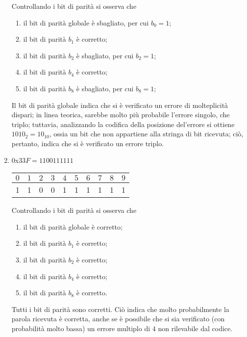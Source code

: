 \documentclass[a4paper]{extarticle}
\renewcommand\arraystretch{}
\begin{document}
\begin{enumerate}
    \vspace{1em}
    \noindent
    Controllando i bit di parità si osserva che
    \begin{enumerate}
        \item il bit di parità globale è sbagliato, per cui $b_0=1$;
        \item il bit di parità $b_1$ è corretto;
        \item il bit di parità $b_2$ è sbagliato, per cui $b_2=1$;
        \item il bit di parità $b_4$ è corretto;
        \item il bit di parità $b_8$ è sbagliato, per cui $b_8=1$; 
    \end{enumerate}
    Il bit di parità globale indica che si è verificato un errore di molteplicità dispari; in linea teorica, sarebbe molto più probabile l'errore singolo, che triplo; tuttavia, analizzando la codifica della posizione del'errore si ottiene $1010_2=10_{10}$, ossia un bit che non appartiene alla stringa di bit ricevuta; ciò, pertanto, indica che si è verificato un errore triplo.

    \item $0$x$33F = 11 0011 1111$

    \noindent
    \begin{table}[H]
    \setlength{\tabcolsep}{4pt}
    \renewcommand{\arraystretch}{1.2}
    \centering
    \begin{tabular}{|c|c|c|c|c|c|c|c|c|c|}
        \hline
        $0$ & $1$ & $2$ & $3$ & $4$ & $5$ & $6$ & $7$ & $8$ & $9$\\
        \hline
        \cellcolor{orange!75!white}1 & \cellcolor{orange!25!white}1 &\cellcolor{orange!25!white}0 & 0 & \cellcolor{orange!25!white}1 & 1 & 1 & 1 & \cellcolor{orange!25!white}1 & 1\\
        \hline
    \end{tabular}
    \end{table}

    \vspace{1em}
    \noindent
    Controllando i bit di parità si osserva che
    \begin{enumerate}
        \item il bit di parità globale è corretto;
        \item il bit di parità $b_1$ è corretto;
        \item il bit di parità $b_2$ è corretto;
        \item il bit di parità $b_4$ è corretto;
        \item il bit di parità $b_8$ è corretto.
    \end{enumerate}
    Tutti i bit di parità sono corretti. Ciò indica che molto probabilmente la parola ricevuta è corretta, anche se è possibile che si sia verificato (con probabilità molto bassa) un errore multiplo di $4$ non rilevabile dal codice.
\end{enumerate}
\end{document}
